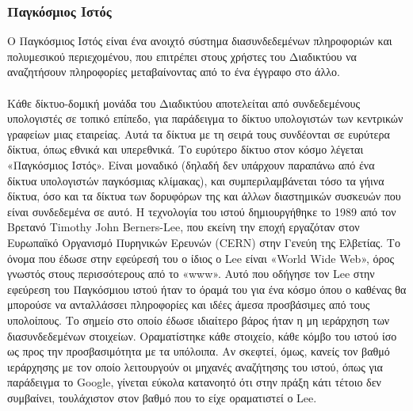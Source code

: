 \documentclass{article}
\begin{document}
\subsubsection{Παγκόσμιος Ιστός}
Ο Παγκόσμιος Ιστός είναι ένα ανοιχτό σύστημα διασυνδεδεμένων πληροφοριών και πολυμεσικού περιεχομένου, που επιτρέπει στους χρήστες του Διαδικτύου να αναζητήσουν πληροφορίες μεταβαίνοντας από το ένα έγγραφο στο άλλο.\\~\\
Κάθε δίκτυο-δομική μονάδα του Διαδικτύου αποτελείται από συνδεδεμένους υπολογιστές σε τοπικό επίπεδο, για παράδειγμα το δίκτυο υπολογιστών των κεντρικών γραφείων μιας εταιρείας. Αυτά τα δίκτυα με τη σειρά τους συνδέονται σε ευρύτερα δίκτυα, όπως εθνικά και υπερεθνικά. Το ευρύτερο δίκτυο στον κόσμο λέγεται «Παγκόσμιος Ιστός». Είναι μοναδικό (δηλαδή δεν υπάρχουν παραπάνω από ένα δίκτυα υπολογιστών παγκόσμιας κλίμακας), και συμπεριλαμβάνεται τόσο τα γήινα δίκτυα, όσο και τα δίκτυα των δορυφόρων της και άλλων διαστημικών συσκευών που είναι συνδεδεμένα σε αυτό.
\newpage
Η τεχνολογία του ιστού δημιουργήθηκε το 1989 από τον Βρετανό Timothy John Berners-Lee, που εκείνη την εποχή εργαζόταν στον Ευρωπαϊκό Οργανισμό Πυρηνικών Ερευνών (CERN) στην Γενεύη της Ελβετίας. Το όνομα που έδωσε στην εφεύρεσή του ο ίδιος ο Lee είναι «World Wide Web», όρος γνωστός στους περισσότερους από το «www». Αυτό που οδήγησε τον Lee στην εφεύρεση του Παγκόσμιου ιστού ήταν το όραμά του για ένα κόσμο όπου ο καθένας θα μπορούσε να ανταλλάσσει πληροφορίες και ιδέες άμεσα προσβάσιμες από τους υπολοίπους. Το σημείο στο οποίο έδωσε ιδιαίτερο βάρος ήταν η μη ιεράρχηση των διασυνδεδεμένων στοιχείων. Οραματίστηκε κάθε στοιχείο, κάθε κόμβο του ιστού ίσο ως προς την προσβασιμότητα με τα υπόλοιπα. Αν σκεφτεί, όμως, κανείς τον βαθμό ιεράρχησης με τον οποίο λειτουργούν οι μηχανές αναζήτησης του ιστού, όπως για παράδειγμα το Google, γίνεται εύκολα κατανοητό ότι στην πράξη κάτι τέτοιο δεν συμβαίνει, τουλάχιστον στον βαθμό που το είχε οραματιστεί ο Lee.
\end{document}
